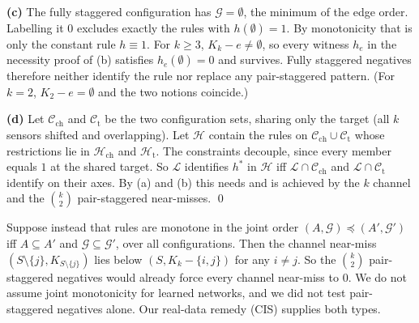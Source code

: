 \textbf{(c)} The fully staggered configuration has $\mathcal G=\emptyset$, the minimum of the edge order. Labelling it $0$ excludes exactly the rules with $h(\emptyset)=1$. By monotonicity that is only the constant rule $h\equiv1$. For $k\ge3$, $K_k-e\ne\emptyset$, so every witness $h_e$ in the necessity proof of (b) satisfies $h_e(\emptyset)=0$ and survives. Fully staggered negatives therefore neither identify the rule nor replace any pair-staggered pattern. (For $k=2$, $K_2-e=\emptyset$ and the two notions coincide.)

\textbf{(d)} Let $\mathcal C_{\mathrm{ch}}$ and $\mathcal C_{\mathrm t}$ be the two configuration sets, sharing only the target (all $k$ sensors shifted and overlapping). Let $\mathcal H$ contain the rules on $\mathcal C_{\mathrm{ch}}\cup\mathcal C_{\mathrm t}$ whose restrictions lie in $\mathcal H_{\mathrm{ch}}$ and $\mathcal H_{\mathrm t}$. The constraints decouple, since every member equals $1$ at the shared target. So $\mathcal L$ identifies $h^*$ in $\mathcal H$ iff $\mathcal L\cap\mathcal C_{\mathrm{ch}}$ and $\mathcal L\cap\mathcal C_{\mathrm t}$ identify on their axes. By (a) and (b) this needs and is achieved by the $k$ channel and the $\binom k2$ pair-staggered near-misses. \qed

\begin{remark}\label{rem:joint}
Suppose instead that rules are monotone in the joint order $(A,\mathcal G)\preceq(A',\mathcal G')$ iff $A\subseteq A'$ and $\mathcal G\subseteq\mathcal G'$, over all configurations. Then the channel near-miss $(S\setminus\{j\},K_{S\setminus\{j\}})$ lies below $(S,K_k-\{i,j\})$ for any $i\ne j$. So the $\binom k2$ pair-staggered negatives would already force every channel near-miss to $0$. We do not assume joint monotonicity for learned networks, and we did not test pair-staggered negatives alone. Our real-data remedy (CIS) supplies both types.
\end{remark}

